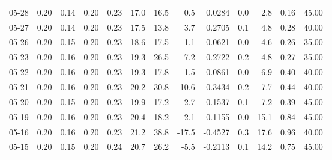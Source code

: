\begin{threeparttable}
{\begin{tabular}{lrrrrrrrrrrrr}
  05-28 &          0.20 &          0.14 &          0.20 &        0.23 &                17.0 &                16.5 &        0.5 &       0.0284 &                 0.0 &              2.8 &            0.16 &                  45.00 \\
  05-27 &          0.20 &          0.14 &          0.20 &        0.23 &                17.5 &                13.8 &        3.7 &       0.2705 &                 0.1 &              4.8 &            0.28 &                  40.00 \\
  05-26 &          0.20 &          0.15 &          0.20 &        0.23 &                18.6 &                17.5 &        1.1 &       0.0621 &                 0.0 &              4.6 &            0.26 &                  35.00 \\
  05-23 &          0.20 &          0.16 &          0.20 &        0.23 &                19.3 &                26.5 &       -7.2 &      -0.2722 &                 0.2 &              4.8 &            0.27 &                  35.00 \\
  05-22 &          0.20 &          0.16 &          0.20 &        0.23 &                19.3 &                17.8 &        1.5 &       0.0861 &                 0.0 &              6.9 &            0.40 &                  40.00 \\
  05-21 &          0.20 &          0.16 &          0.20 &        0.23 &                20.2 &                30.8 &      -10.6 &      -0.3434 &                 0.2 &              7.7 &            0.44 &                  40.00 \\
  05-20 &          0.20 &          0.15 &          0.20 &        0.23 &                19.9 &                17.2 &        2.7 &       0.1537 &                 0.1 &              7.2 &            0.39 &                  45.00 \\
  05-19 &          0.20 &          0.16 &          0.20 &        0.23 &                20.4 &                18.2 &        2.1 &       0.1155 &                 0.0 &             15.1 &            0.84 &                  45.00 \\
  05-16 &          0.20 &          0.16 &          0.20 &        0.23 &                21.2 &                38.8 &      -17.5 &      -0.4527 &                 0.3 &             17.6 &            0.96 &                  40.00 \\
  05-15 &          0.20 &          0.15 &          0.20 &        0.24 &                20.7 &                26.2 &       -5.5 &      -0.2113 &                 0.1 &             14.2 &            0.75 &                  45.00 \\

\end{tabular}}
\end{threeparttable}
